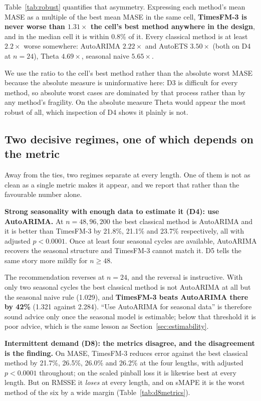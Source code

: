 \documentclass[article]{ajs}
\providecommand{\sectionref}[1]{Section~\ref{#1}}
\providecommand{\tableref}[1]{Table~\ref{#1}}
\begin{document}
\tableref{tab:robust} quantifies that asymmetry. Expressing each method's mean MASE as a
multiple of the best mean MASE in the same cell, \textbf{TimesFM-3 is never worse than
$1.31\times$ the cell's best method anywhere in the design}, and in the median cell it is within
0.8\% of it. Every classical method is at least $2.2\times$ worse somewhere: AutoARIMA
$2.22\times$ and AutoETS $3.50\times$ (both on D4 at $n = 24$), Theta $4.69\times$, seasonal
naive $5.65\times$.

We use the ratio to the cell's best method rather than the absolute worst MASE because the
absolute measure is uninformative here: D3 is difficult for every method, so absolute worst
cases are dominated by that process rather than by any method's fragility. On the absolute
measure Theta would appear the most robust of all, which inspection of D4 shows it plainly is
not.



\subsection{Two decisive regimes, one of which depends on the metric}

Away from the ties, two regimes separate at every length. One of them is not as clean as a
single metric makes it appear, and we report that rather than the favourable number alone.

\textbf{Strong seasonality with enough data to estimate it (D4): use AutoARIMA.} At
$n = 48, 96, 200$ the best classical method is AutoARIMA and it is better than TimesFM-3 by
21.8\%, 21.1\% and 23.7\% respectively, all with adjusted $p < 0.0001$. Once at least four
seasonal cycles are available, AutoARIMA recovers the seasonal structure and TimesFM-3 cannot
match it. D5 tells the same story more mildly for $n \geq 48$.

The recommendation reverses at $n = 24$, and the reversal is instructive. With only two seasonal
cycles the best classical method is not AutoARIMA at all but the seasonal naive rule (1.029),
and \textbf{TimesFM-3 beats AutoARIMA there by 42\%} (1.321 against 2.284). ``Use AutoARIMA for
seasonal data'' is therefore sound advice only once the seasonal model is estimable; below that
threshold it is poor advice, which is the same lesson as \sectionref{sec:estimability}.

\textbf{Intermittent demand (D8): the metrics disagree, and the disagreement is the finding.}
On MASE, TimesFM-3 reduces error against the best classical method by 21.7\%, 26.5\%, 26.0\% and
26.2\% at the four lengths, with adjusted $p < 0.0001$ throughout; on the scaled pinball loss it
is likewise best at every length. But on RMSSE it \emph{loses} at every length, and on sMAPE it
is the worst method of the six by a wide margin (\tableref{tab:d8metrics}).
\end{document}
